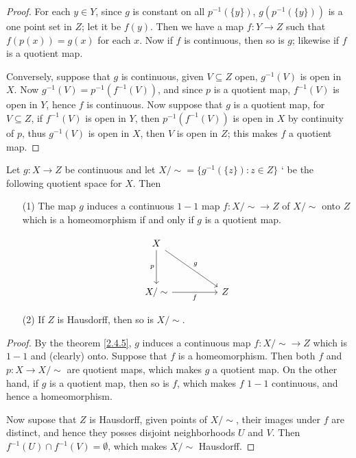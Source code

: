 \begin{proof}
    For each $y \in Y$, since  $g$ is constant on all  $p^{-1}(\{y\})$,
    $g(p^{-1}(\{y\}))$ is a one
    point set in $Z$; let it be $f(y)$. Then we have a map $f:Y \rightarrow Z$ such that
    $f(p(x))=g(x)$ for each $x$. Now if  $f$ is continuous, then so is  $g$; likewise if  $f$ is a
    quotient map.

    Conversely, suppose that  $g$ is continuous, given  $V \subseteq Z$ open,  $g^{-1}(V)$ is open
    in $X$. Now  $g^{-1}(V)=p^{-1}(f^{-1}(V))$, and since $p$ is a quotient map,  $f^{-1}(V)$ is
    open in $Y$, hence  $f$ is continuous. Now suppose that  $g$ is a quotient map, for  $V
    \subseteq Z$, if  $f^{-1}(V)$ is open in $Y$, then  $p^{-1}(f^{-1}(V))$ is open in $X$ by
    continuity of  $p$, thus  $g^{-1}(V)$ is open in $X$, then  $V$ is open in  $Z$; this makes  $f$
    a quotient map.
\end{proof}
\begin{corollary}
    Let $g:X \rightarrow Z$ be continuous and let $X/\sim=\{g^{-1}(\{z\}):z \in Z\}$ ` be the
    following quotient space for $X$. Then
        \begin{enumerate}
            \item[(1)] The map $g$ induces a continuous  $1-1$ map  $f:X/\sim \rightarrow Z$ of  $X/\sim$
                onto  $Z$ which is a homeomorphism if and only if $g$ is a quotient map.

                \[\begin{tikzcd}
	                X \\
	                \\
	                {X/\sim} && Z
	                \arrow["p"', from=1-1, to=3-1]
	                \arrow["f"', from=3-1, to=3-3]
	                \arrow["g", from=1-1, to=3-3]
                    \end{tikzcd}\]

            \item[(2)] If $Z$ is Hausdorff, then so is  $X/\sim$.
        \end{enumerate}
\end{corollary}
\begin{proof}
    By the theorem \ref{2.4.5}, $g$ induces a continuous map  $f:X/\sim \rightarrow Z$ which is
    $1-1$ and  (clearly) onto. Suppose that $f$ is a homeomorphism. Then both  $f$ and  $p:X
    \rightarrow X/\sim$ are quotient maps, which makes  $g$ a quotient map. On the other hand, if
    $g$ is a quotient map, then so is  $f$, which makes  $f$  $1-1$ continuous, and hence a
    homeomorphism.

    Now supose that  $Z$ is Hausdorff, given points of  $X/\sim$, their images under  $f$ are
    distinct, and hence they posses disjoint neighborhoods  $U$ and  $V$. Then  $f^{-1}(U) \cap
    f^{-1}(V)=\emptyset$, which makes $X/\sim$ Hausdorff.
\end{proof}

